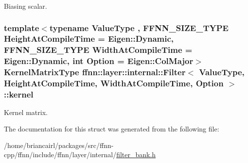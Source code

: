 Biasing scalar. 

\hypertarget{structffnn_1_1layer_1_1internal_1_1_filter_a4e768c6ca11ca77ce1373bf40e986e78}{
\subsubsection[{kernel}]{\setlength{\rightskip}{0pt plus 5cm}template$<$typename Value\-Type , F\-F\-N\-N\-\_\-\-S\-I\-Z\-E\-\_\-\-T\-Y\-P\-E Height\-At\-Compile\-Time = Eigen\-::\-Dynamic, F\-F\-N\-N\-\_\-\-S\-I\-Z\-E\-\_\-\-T\-Y\-P\-E Width\-At\-Compile\-Time = Eigen\-::\-Dynamic, int Option = Eigen\-::\-Col\-Major$>$ {\bf Kernel\-Matrix\-Type} {\bf ffnn\-::layer\-::internal\-::\-Filter}$<$ Value\-Type, Height\-At\-Compile\-Time, Width\-At\-Compile\-Time, Option $>$\-::kernel}}\label{structffnn_1_1layer_1_1internal_1_1_filter_a4e768c6ca11ca77ce1373bf40e986e78}


Kernel matrix. 



The documentation for this struct was generated from the following file\-:\begin{DoxyCompactItemize}
\item 
/home/briancairl/packages/src/ffnn-\/cpp/ffnn/include/ffnn/layer/internal/\hyperlink{filter__bank_8h}{filter\-\_\-bank.\-h}\end{DoxyCompactItemize}
